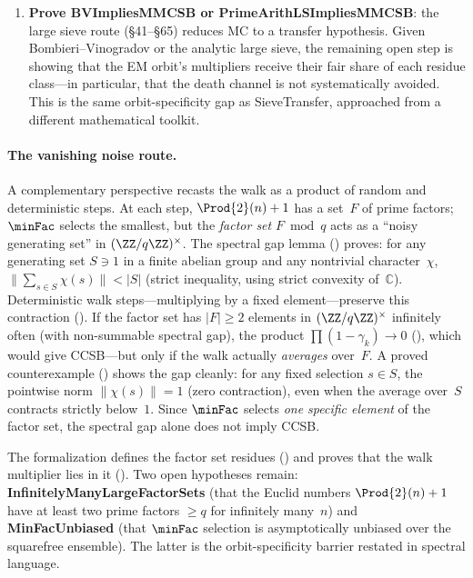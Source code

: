 \begin{enumerate}
\item \textbf{Prove BVImpliesMMCSB or PrimeArithLSImpliesMMCSB}: the
  large sieve route (\S41--\S65) reduces MC to a transfer hypothesis.
  Given Bombieri--Vinogradov or the analytic large sieve, the remaining
  open step is showing that the EM orbit's multipliers receive their
  fair share of each residue class---in particular, that the death
  channel is not systematically avoided.  This is the same
  orbit-specificity gap as SieveTransfer, approached from a different
  mathematical toolkit.
\end{enumerate}

\paragraph{The vanishing noise route.}
A complementary perspective recasts the walk as a product of random
and deterministic steps.  At each step, $\Prod{2}(n)+1$ has a set~$F$
of prime factors; $\minFac$ selects the smallest, but the
\emph{factor set} $F \bmod q$ acts as a ``noisy generating set'' in
$(\ZZ/q\ZZ)^\times$.  The spectral gap lemma
()
proves: for any generating set $S \ni 1$ in a finite abelian group
and any nontrivial character~$\chi$,
$\|\sum_{s \in S} \chi(s)\| < |S|$
(strict inequality, using strict convexity of~$\mathbb{C}$).
Deterministic walk steps---multiplying by a fixed element---preserve
this contraction
().
If the factor set has $|F| \geq 2$ elements in $(\ZZ/q\ZZ)^\times$
infinitely often (with non-summable spectral gap), the product
$\prod(1 - \gamma_k) \to 0$
(),
which would give CCSB---but only if the walk actually \emph{averages}
over~$F$.  A proved counterexample
()
shows the gap cleanly: for any fixed selection $s \in S$, the
pointwise norm $\|\chi(s)\| = 1$ (zero contraction), even when the
average over~$S$ contracts strictly below~$1$.
Since $\minFac$ selects \emph{one specific element} of the factor set,
the spectral gap alone does not imply CCSB\@.

The formalization defines the factor set residues
()
and proves that the walk multiplier lies in it
().
Two open hypotheses remain:
\textbf{InfinitelyManyLargeFactorSets} (that the Euclid numbers
$\Prod{2}(n)+1$ have at least two prime factors $\geq q$ for
infinitely many~$n$) and
\textbf{MinFacUnbiased} (that $\minFac$ selection is asymptotically
unbiased over the squarefree ensemble).
The latter is the orbit-specificity barrier
restated in spectral language.

